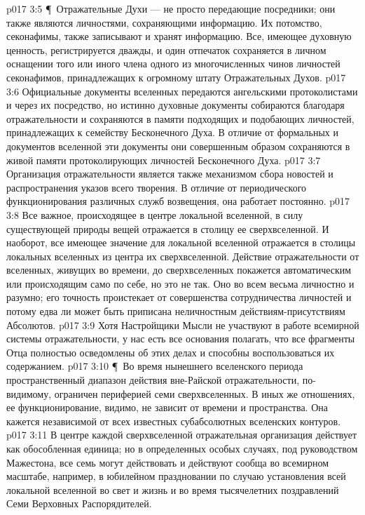 \vs p017 3:5 \P\ Отражательные Духи --- не просто передающие посредники; они также являются личностями, сохраняющими информацию. Их потомство, секонафимы, также записывают и хранят информацию. Все, имеющее духовную ценность, регистрируется дважды, и один отпечаток сохраняется в личном оснащении того или иного члена одного из многочисленных чинов личностей секонафимов, принадлежащих к огромному штату Отражательных Духов.
\vs p017 3:6 Официальные документы вселенных передаются ангельскими протоколистами и через их посредство, но истинно духовные документы собираются благодаря отражательности и сохраняются в памяти подходящих и подобающих личностей, принадлежащих к семейству Бесконечного Духа. В отличие от формальных и  документов вселенной эти документы  они совершенным образом сохраняются в живой памяти протоколирующих личностей Бесконечного Духа.
\vs p017 3:7 Организация отражательности является также механизмом сбора новостей и распространения указов всего творения. В отличие от периодического функционирования различных служб возвещения, она работает постоянно.
\vs p017 3:8 Все важное, происходящее в центре локальной вселенной, в силу существующей природы вещей отражается в столицу ее сверхвселенной. И наоборот, все имеющее значение для локальной вселенной отражается в столицы локальных вселенных из центра их сверхвселенной. Действие отражательности от вселенных, живущих во времени, до сверхвселенных покажется автоматическим или происходящим само по себе, но это не так. Оно во всем весьма личностно и разумно; его точность проистекает от совершенства сотрудничества личностей и потому едва ли может быть приписана неличностным действиям\hyp{}присутствиям Абсолютов.
\vs p017 3:9 Хотя Настройщики Мысли не участвуют в работе всемирной системы отражательности, у нас есть все основания полагать, что все фрагменты Отца полностью осведомлены об этих делах и способны воспользоваться их содержанием.
\vs p017 3:10 \P\ Во время нынешнего вселенского периода пространственный диапазон действия вне\hyp{}Райской отражательности, по\hyp{}видимому, ограничен периферией семи сверхвселенных. В иных же отношениях, ее функционирование, видимо, не зависит от времени и пространства. Она кажется независимой от всех известных субабсолютных вселенских контуров.
\vs p017 3:11 В центре каждой сверхвселенной отражательная организация действует как обособленная единица; но в определенных особых случаях, под руководством Мажестона, все семь могут действовать и действуют сообща во всемирном масштабе, например, в юбилейном праздновании по случаю установления всей локальной вселенной во свет и жизнь и во время тысячелетних поздравлений Семи Верховных Распорядителей.
